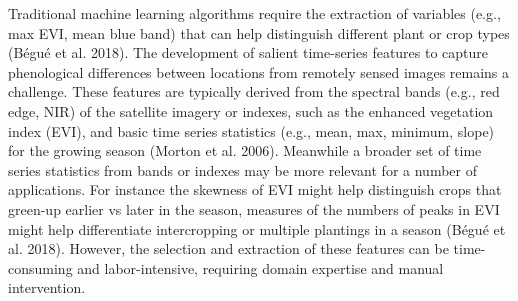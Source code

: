\documentclass[
  journal,
  twocolumn]{IEEEtran}
\begin{document}
Traditional machine learning algorithms require the extraction of
variables (e.g., max EVI, mean blue band) that can help distinguish
different plant or crop types (Bégué et al. 2018). The development of
salient time-series features to capture phenological differences between
locations from remotely sensed images remains a challenge. These
features are typically derived from the spectral bands (e.g., red edge,
NIR) of the satellite imagery or indexes, such as the enhanced
vegetation index (EVI), and basic time series statistics (e.g., mean,
max, minimum, slope) for the growing season (Morton et al. 2006).
Meanwhile a broader set of time series statistics from bands or indexes
may be more relevant for a number of applications. For instance the
skewness of EVI might help distinguish crops that green-up earlier vs
later in the season, measures of the numbers of peaks in EVI might help
differentiate intercropping or multiple plantings in a season (Bégué et
al. 2018). However, the selection and extraction of these features can
be time-consuming and labor-intensive, requiring domain expertise and
manual intervention.
\end{document}
